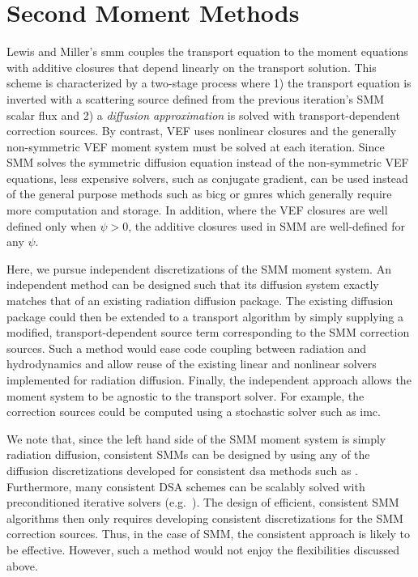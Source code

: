 \documentclass[../doc.tex]{subfiles}
\begin{document}
\chapter{Second Moment Methods} \label{chap:smm}
Lewis and Miller's \gls{smm} \cite{lewis_miller} couples the transport equation to the moment equations with additive closures that depend linearly on the transport solution. This scheme is characterized by a two-stage process where 1) the transport equation is inverted with a scattering source defined from the previous iteration's SMM scalar flux and 2) a \emph{diffusion approximation} is solved with transport-dependent correction sources. By contrast, VEF uses nonlinear closures and the generally non-symmetric VEF moment system must be solved at each iteration. Since SMM solves the symmetric diffusion equation instead of the non-symmetric VEF equations, less expensive solvers, such as conjugate gradient, can be used instead of the general purpose methods such as \gls{bicg} or \gls{gmres} which generally require more computation and storage. 
In addition, where the VEF closures are well defined only when $\psi>0$, the additive closures used in SMM are well-defined for any $\psi$. 

Here, we pursue independent discretizations of the SMM moment system. 
An independent method can be designed such that its diffusion system exactly matches that of an existing radiation diffusion package. The existing diffusion package could then be extended to a transport algorithm by simply supplying a modified, transport-dependent source term corresponding to the SMM correction sources. Such a method would ease code coupling between radiation and hydrodynamics and allow reuse of the existing linear and nonlinear solvers implemented for radiation diffusion. Finally, the independent approach allows the moment system to be agnostic to the transport solver. For example, the correction sources could be computed using a stochastic solver such as \gls{imc}. 

We note that, since the left hand side of the SMM moment system is simply radiation diffusion, consistent SMMs can be designed by using any of the diffusion discretizations developed for consistent \gls{dsa} methods such as \textcite{WWM,AM,WR,ldrd_dsa}. Furthermore, many consistent DSA schemes can be scalably solved with preconditioned iterative solvers (e.g.~\cite{ldrd_dsa,WR}). The design of efficient, consistent SMM algorithms then only requires developing consistent discretizations for the SMM correction sources. Thus, in the case of SMM, the consistent approach is likely to be effective. However, such a method would not enjoy the flexibilities discussed above. 
\end{document}
